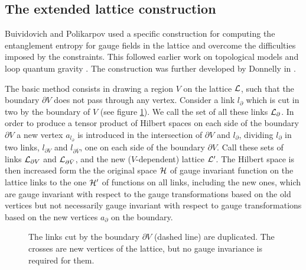 \documentclass[12pt,a4paper]{article}
\begin{document}
\subsection{The extended lattice construction}
 Buividovich and Polikarpov \cite{Polikarpov} used a specific construction for computing the entanglement entropy for gauge fields in the lattice and 
overcome the difficulties imposed by the constraints. This followed earlier work on topological models \cite{Wen,zanardi} and loop quantum 
gravity \cite{dongrav}. The construction was further developed by Donnelly in \cite{donnelly}. 

The basic method consists in drawing a region $V$ on the lattice ${\cal L}$, such that the boundary $\partial V$ does not pass through any vertex. Consider a link $l_\partial$  which is cut in two by 
the boundary of $V$ (see figure \ref{buido}). We call the set of all these links $ {\cal L}_{\partial}$. In order to produce a tensor product of Hilbert spaces 
on each side of the boundary $\partial V$ a new vertex $a_{l_\partial}$ is introduced in the intersection of $\partial V$ and $l_\partial$, 
dividing $l_{\partial}$ in two links, $l_{\partial V}$ and $l_{\partial \bar{V}}$, one on each side of the boundary $\partial V$. Call these 
sets of links ${\cal L}_{\partial V}$ and ${\cal L}_{\partial \bar{V}}$, and the new ($V$-dependent) lattice ${\cal L}^\prime$. The Hilbert space  is 
then increased form the the original space ${\cal H}$ of gauge invariant function on the lattice links to the one ${\cal H}^\prime$ of 
functions on all links, including the new ones, which are gauge invariant with respect to the gauge transformations based on the old vertices 
but not necessarily gauge invariant with respect to gauge transformations based on the new vertices $a_\partial$ on the boundary.

\begin{figure}
\centering
\leavevmode
\epsfysize=4cm
\bigskip
\caption{The links cut by the boundary $\partial V$ (dashed line) are duplicated. The crosses are new vertices of the lattice, but 
no gauge invariance is required for them. }
\label{buido}
\end{figure}
\end{document}
